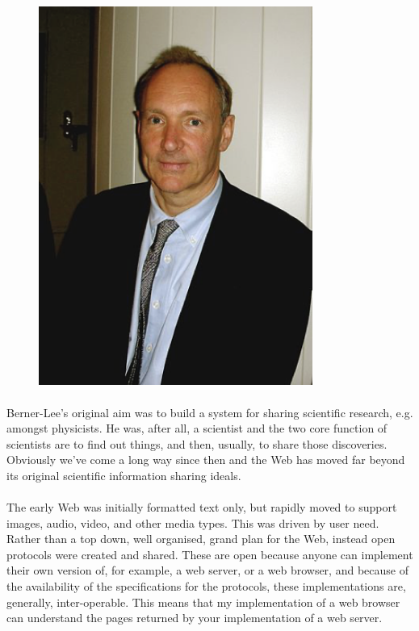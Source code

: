 \documentclass[12pt, a4paper, oneside]{book}
\begin{document}
\begin{figure}[H]
\centering
\includegraphics[width=0.8\textwidth]{figures/tim-berners-lee.png}
\label{fig:tim-berners-lee}
\end{figure}


\paragraph{} Berner-Lee's original aim was to build a system for sharing scientific research, e.g. amongst physicists. He was, after all, a scientist and the two core function of scientists are to find out things, and then, usually, to share those discoveries. Obviously we’ve come a long way since then and the Web has moved far beyond its original scientific information sharing ideals.
\paragraph{} The early Web was initially formatted text only, but rapidly moved to support images, audio, video, and other media types. This was driven by user need. Rather than a top down, well organised, grand plan for the Web, instead open protocols were created and shared. These are open because anyone can implement their own version of, for example, a web server, or a web browser, and because of the availability of the specifications for the protocols, these implementations are, generally, inter-operable. This means that my implementation of a web browser can understand the pages returned by your implementation of a web server.
\end{document}
